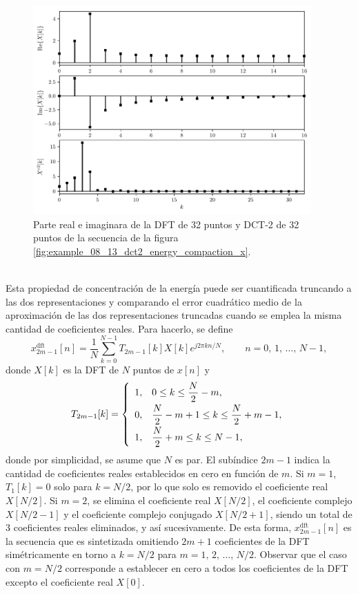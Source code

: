 \documentclass[a4paper]{report}
\begin{document}
\begin{figure}[!htb]
 \begin{center}
 \includegraphics[width=0.95\textwidth]{figuras/example_08_13_dct2_energy_compaction_DFT_DCT2.pdf}
 \caption{\label{fig:example_08_13_dct2_energy_compaction_DFT_DCT2} Parte real e imaginara de la DFT de 32 puntos y DCT-2 de 32 puntos de la secuencia de la figura \ref{fig:example_08_13_dct2_energy_compaction_x}.}
 \end{center}
\end{figure}
\\
Esta propiedad de concentración de la energía puede ser cuantificada truncando a las dos representaciones y comparando el error cuadrático medio de la aproximación de las dos representaciones truncadas cuando se emplea la misma cantidad de coeficientes reales. Para hacerlo, se define 
\[
 x_{2m-1}^\textrm{dft}[n]=\frac{1}{N}\sum_{k=0}^{N-1}T_{2m-1}[k]X[k]e^{j2\pi kn/N},
 \qquad 
 n=0,\,1,\,\dots,\,N-1,
\]
donde \(X[k]\) es la DFT de \(N\) puntos de \(x[n]\) y
\[
 T_{2m-1}[k]=
 \left\{ 
 \begin{array}{ll}
  1, & 0\leq k\leq \dfrac{N}{2}-m,\\[\medskipamount]
  0, & \dfrac{N}{2}-m+1\leq k\leq \dfrac{N}{2}+m-1,\\[\medskipamount]
  1, & \dfrac{N}{2}+m\leq k\leq N-1,
 \end{array}
 \right. 
\]
donde por simplicidad, se asume que \(N\) es par. El subíndice \(2m-1\) indica la cantidad de coeficientes reales establecidos en cero en función de \(m\). Si \(m=1\), \(T_1[k]=0\) solo para \(k=N/2\), por lo que solo es removido el coeficiente real \(X[N/2]\). Si \(m=2\), se elimina el coeficiente real \(X[N/2]\), el coeficiente complejo \(X[N/2-1]\) y el coeficiente complejo conjugado \(X[N/2+1]\), siendo un total de 3 coeficientes reales eliminados, y así sucesivamente. De esta forma, \(x_{2m-1}^\textrm{dft}[n]\) es la secuencia que es sintetizada omitiendo \(2m+1\) coeficientes de la DFT simétricamente en torno a \(k=N/2\) para \(m=1,\,2,\,\dots,\,N/2\). Observar que el caso con \(m=N/2\) corresponde a establecer en cero a todos los coeficientes de la DFT excepto el coeficiente real \(X[0]\).
\end{document}
